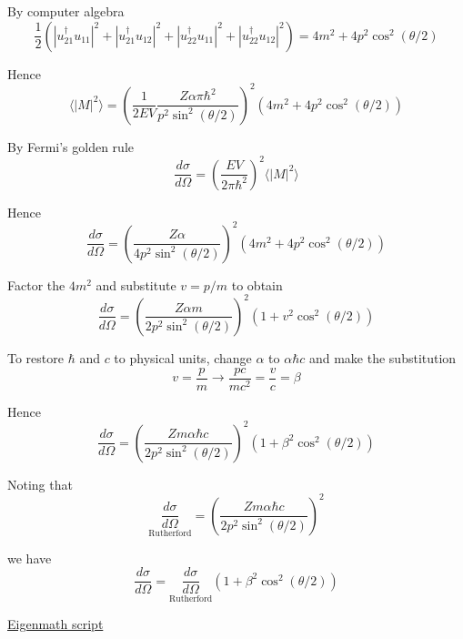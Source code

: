 By computer algebra
\begin{equation*}
\frac{1}{2}
\left(|u_{21}^\dag u_{11}|^2+|u_{21}^\dag u_{12}|^2+|u_{22}^\dag u_{11}|^2+|u_{22}^\dag u_{12}|^2\right)
=4m^2+4p^2\cos^2(\theta/2)
\tag{2}
\end{equation*}

Hence
\begin{equation*}
\langle|M|^2\rangle
=\left(\frac{1}{2EV}
\frac{Z\alpha\pi\hbar^2}{p^2\sin^2(\theta/2)}\right)^2
\left(4m^2+4p^2\cos^2(\theta/2)\right)
\end{equation*}

By Fermi's golden rule
\begin{equation*}
\frac{d\sigma}{d\Omega}=\left(\frac{EV}{2\pi\hbar^2}\right)^2\langle|M|^2\rangle
\end{equation*}

Hence
\begin{equation*}
\frac{d\sigma}{d\Omega}
=\left(\frac{Z\alpha}{4p^2\sin^2(\theta/2)}\right)^2
\left(4m^2+4p^2\cos^2(\theta/2)\right)
\tag{3}
\end{equation*}

Factor the $4m^2$ and substitute $v=p/m$ to obtain
\begin{equation*}
\frac{d\sigma}{d\Omega}
=\left(\frac{Z\alpha m}{2p^2\sin^2(\theta/2)}\right)^2
\left(1+v^2\cos^2(\theta/2)\right)
\tag{4}
\end{equation*}

To restore $\hbar$ and $c$ to physical units,
change $\alpha$ to $\alpha\hbar c$ and
make the substitution
\begin{equation*}
v=\frac{p}{m}\rightarrow\frac{pc}{mc^2}=\frac{v}{c}=\beta
\end{equation*}

Hence
\begin{equation*}
\frac{d\sigma}{d\Omega}
=\left(\frac{Zm\alpha\hbar c}{2p^2\sin^2(\theta/2)}\right)^2
\left(1+\beta^2\cos^2(\theta/2)\right)
\end{equation*}

Noting that
\begin{equation*}
\underset{\text{Rutherford}}{\frac{d\sigma}{d\Omega}}
=\left(\frac{Zm\alpha\hbar c}{2p^2\sin^2(\theta/2)}\right)^2
\end{equation*}

we have
\begin{equation*}
\frac{d\sigma}{d\Omega}
=\underset{\text{Rutherford}}{\frac{d\sigma}{d\Omega}}
\left(1+\beta^2\cos^2(\theta/2)\right)
\end{equation*}

\href{https://georgeweigt.github.io/examples/mott-scattering-demo.html}{Eigenmath script}


